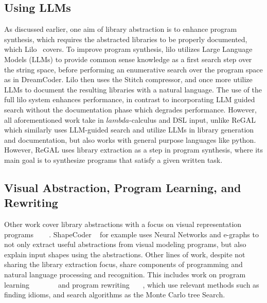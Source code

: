 \subsection{Using LLMs}
As discussed earlier, one aim of library abstraction is to enhance program synthesis, which requires the abstracted libraries to be properly documented, which Lilo~\cite{grand2024lilo} covers. To improve program synthesis, lilo utilizes Large Language Models (LLMs) to provide common sense knowledge as a first search step over the string space, before performing an enumerative search over the program space as in DreamCoder. Lilo then uses the Stitch compressor, and once more utilize LLMs to document the resulting libraries with a natural language. The use of the full lilo system enhances performance, in contrast to incorporating LLM guided search without the documentation phase which degrades performance. However, all aforementioned work take in \(lambda\)-calculus and DSL input, unlike ReGAL~\cite{stengeleskin2024regal} which similarly uses LLM-guided search and utilize LLMs in library generation and documentation, but also works with general purpose languages like python. However, ReGAL uses library extraction as a step in program synthesis, where its main goal is to synthesize programs that satisfy a given written task. 

\subsection{Visual Abstraction, Program Learning, and Rewriting}
Other work cover library abstractions with a focus on visual representation programs ~\cite{jones2023shapecoder} ~\cite{wang2021learningVisAbst}~\cite{Jones_2021}. ShapeCoder ~\cite{jones2023shapecoder}  for example uses Neural Networks and e-graphs to not only extract useful abstractions from visual modeling programs, but also explain input shapes using the abstractions. 
Other lines of work, despite not sharing the library extraction focus, share components of programming and natural language processing and recognition. This includes work on program learning~\cite{cropper2019playgol}~\cite{DBLP:journals/corr/abs-2004-09931refproginduc}~\cite{wong2022leveraging}  ~\cite{demo}~\cite{iyer2019learning} ~\cite{hocquette2024learning} and program rewriting~\cite{brandfonbrener2024verified} ~\cite{DBLP:conf/sat/NotzliRBNPBT19rewrite}~\cite{ganeshan2023improving}, which use relevant methods such as finding idioms, and search algorithms as the Monte Carlo tree Search. 




